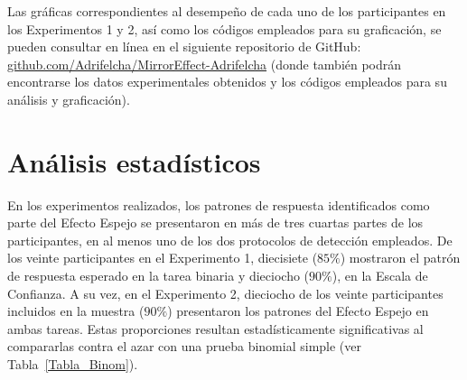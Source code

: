 Las gráficas correspondientes al desempeño de cada uno de los participantes en los Experimentos 1 y 2, así como los códigos empleados para su graficación, se pueden consultar en línea en el siguiente repositorio de GitHub: \href{http://github.com/Adrifelcha/MirrorEffect-Adrifelcha}{github.com/Adrifelcha/MirrorEffect-Adrifelcha} (donde también podrán encontrarse los datos experimentales obtenidos y los códigos empleados para su análisis y graficación).\\




































\section{Análisis estadísticos}

En los experimentos realizados, los patrones de respuesta identificados como parte del Efecto Espejo se presentaron en más de tres cuartas partes de los participantes, en al menos uno de los dos protocolos de detección empleados. De los veinte participantes en el Experimento 1, diecisiete ($85\%$) mostraron el patrón de respuesta esperado en la tarea binaria y dieciocho ($90\%$), en la Escala de Confianza. A su vez, en el Experimento 2, dieciocho de los veinte participantes incluidos en la muestra ($90\%$) presentaron los patrones del Efecto Espejo en ambas tareas. Estas proporciones resultan estadísticamente significativas al compararlas contra el azar con una prueba binomial simple (ver Tabla~\ref{Tabla_Binom}).\\

